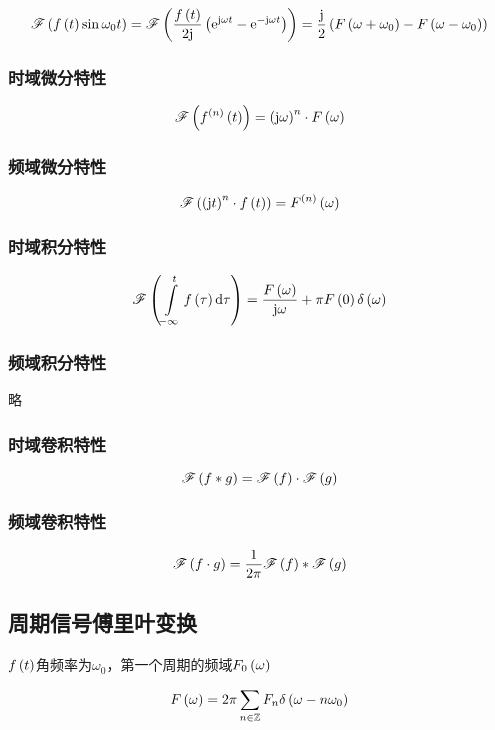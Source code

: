 \documentclass{article}
\begin{document}
\[\fourier{\ft\sin\omega_0t}
    =\fourier{\frac\ft{2\j}\pare{\e^{\j\omega t}-\e^{-\j\omega t}}}
    =\frac\j2\pare{F\pare{\omega+\omega_0}-F\pare{\omega-\omega_0}}\]

\subsubsection{时域微分特性}

\[\fourier{f^{\pare{n}}\pare{t}}=\pare{\j\omega}^n\cdot \fw\]

\subsubsection{频域微分特性}

\[\fourier{\pare{\j t}^n\cdot\ft}=F^{\pare{n}}\pare{\omega}\]

\subsubsection{时域积分特性}

\[\fourier{\int\limits_{-\infty}^tf\pare{\tau}\d\tau}=\frac{\fw}{\j\omega}+\pi F\pare{0}\delta\pare{\omega}\]

\subsubsection{频域积分特性}

略

\subsubsection{时域卷积特性}

\[\fourier{f\ast g}=\fourier f\cdot\fourier g\]

\subsubsection{频域卷积特性}

\[\fourier{f\cdot g}=\frac1{2\pi}\fourier f\ast\fourier g\]

\subsection{周期信号傅里叶变换}

$\ft$角频率为$\omega_0$，第一个周期的频域$F_0\pare{\omega}$

\[\fw=2\pi\sumsz F_n\delta\pare{\omega-n\omega_0}\]
\end{document}
